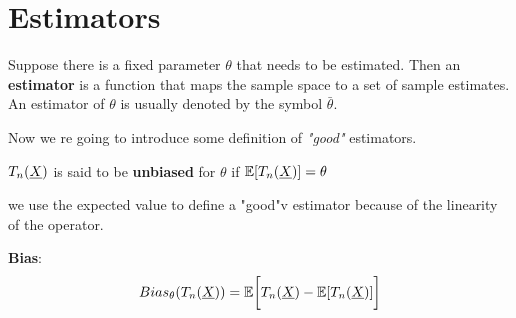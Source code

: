 \section{Estimators}

\begin{defi}
	Suppose there is a fixed parameter $\theta$ that needs to be estimated. Then an \textbf{estimator} is a function that maps the sample space to a set of sample estimates. An estimator of $\theta$ is usually denoted by the symbol $\bar \theta$.
\end{defi}
Now we re going to introduce some definition of \textit{"good"} estimators.
\begin{defi}
	$T_n(\underline X)$ is said to be \textbf{unbiased} for $\theta$ if $\mathbb{E}[T_n(\underline X)]=\theta$
\end{defi}
\begin{oss}
	we use the expected value to define a "good"v estimator because of the linearity of the operator.
\end{oss}
\begin{defi}
	\textbf{Bias}:
	\[
		Bias_\theta (T_n(\underline X))=\mathbb{E}\bigg[T_n(\underline X)-\mathbb{E}[T_n(\underline X)]\bigg]
	\]
\end{defi}

